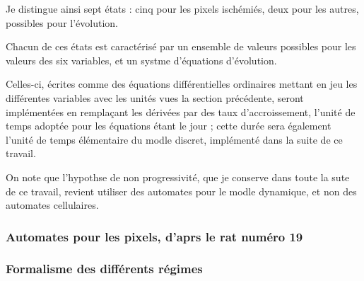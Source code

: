 \ligneinter
Je distingue ainsi sept \'etats : cinq pour les pixels isch\'emi\'es, deux pour les autres, possibles pour l'\'evolution.

\par
Chacun de ces \'etats est caract\'eris\'e par un ensemble de valeurs possibles pour les valeurs des six variables, %
et un systme d'\'equations d'\'evolution.

\par
Celles-ci, \'ecrites comme des \'equations diff\'erentielles ordinaires mettant en jeu les diff\'erentes variables avec les unit\'es vues  la section pr\'ec\'edente, %
seront impl\'ement\'ees en rempla\c cant les d\'eriv\'ees par des taux d'accroissement, l'unit\'e de temps adopt\'ee pour les \'equations \'etant le jour ; %
cette dur\'ee sera \'egalement l'unit\'e de temps \'el\'ementaire du modle discret, impl\'ement\'e dans la suite de ce travail.

\etoile
On note que l'hypothse de non progressivit\'e, que je conserve dans toute la sute de ce travail, %
revient  utiliser des automates pour le modle dynamique, et non des automates cellulaires. %


\subsubsection{Automates pour les pixels, d'aprs le rat num\'ero 19}





\subsubsection{Formalisme des diff\'erents r\'egimes}

